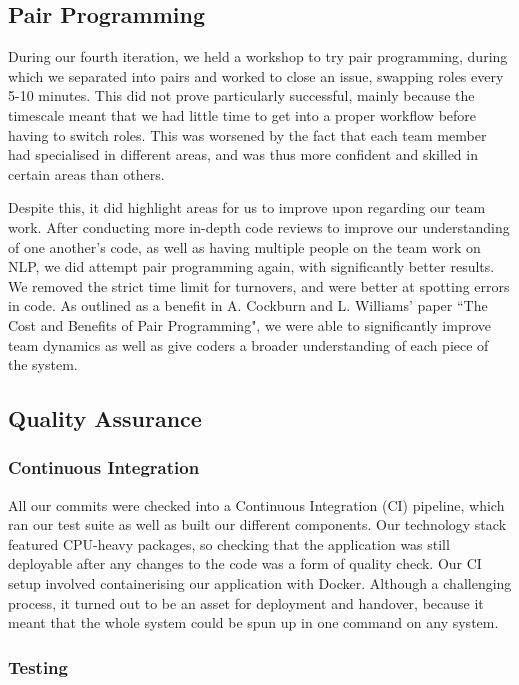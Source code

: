 \documentclass{l3proj}
\begin{document}
\subsection{Pair Programming}

During our fourth iteration, we held a workshop to try pair programming, during which we separated into pairs and worked to close an issue, swapping roles every 5-10 minutes. This did not prove particularly successful, mainly because the timescale meant that we had little time to get into a proper workflow before having to switch roles. This was worsened by the fact that each team member had specialised in different areas, and was thus more confident and skilled in certain areas than others.

Despite this, it did highlight areas for us to improve upon regarding our team work. After conducting more in-depth code reviews to improve our understanding of one another's code, as well as having multiple people on the team work on NLP, we did attempt pair programming again, with significantly better results. We removed the strict time limit for turnovers, and were better at spotting errors in code. As outlined as a benefit in A. Cockburn and L. Williams' paper ``The Cost and Benefits of Pair Programming", we were able to significantly improve team dynamics as well as give coders a broader understanding of each piece of the system\cite{pairprog}.

\subsection{Quality Assurance}

\subsubsection{Continuous Integration}
\label{subsubsec:ci}

All our commits were checked into a Continuous Integration (CI) pipeline, which ran our test suite as well as built our different components. Our technology stack featured CPU-heavy packages, so checking that the application was still deployable after any changes to the code was a form of quality check. Our CI setup involved containerising our application with Docker. Although a challenging process, it turned out to be an asset for deployment and handover, because it meant that the whole system could be spun up in one command on any system.

\subsubsection{Testing}
\end{document}
